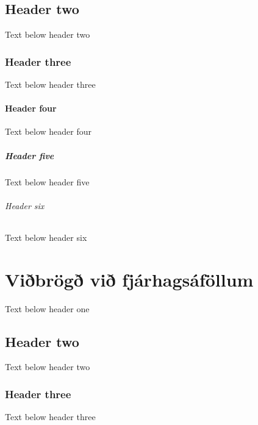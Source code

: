 \documentclass[a4paper,10pt,icelandic]{sphinxmanual}
\begin{document}
\section{Header two}
\label{\detokenize{eftirlaun-og-langtimassparnadur/index:header-two}}
\sphinxAtStartPar
Text below header two


\subsection{Header three}
\label{\detokenize{eftirlaun-og-langtimassparnadur/index:header-three}}
\sphinxAtStartPar
Text below header three


\subsubsection{Header four}
\label{\detokenize{eftirlaun-og-langtimassparnadur/index:header-four}}
\sphinxAtStartPar
Text below header four


\paragraph{Header five}
\label{\detokenize{eftirlaun-og-langtimassparnadur/index:header-five}}
\sphinxAtStartPar
Text below header five


\subparagraph{Header six}
\label{\detokenize{eftirlaun-og-langtimassparnadur/index:header-six}}
\sphinxAtStartPar
Text below header six

\sphinxstepscope


\chapter{Viðbrögð við fjárhagsáföllum}
\label{\detokenize{vidbrogd-vid-fjarhagsafollum/index:vibrog-vi-fjarhagsafollum}}\label{\detokenize{vidbrogd-vid-fjarhagsafollum/index::doc}}
\sphinxAtStartPar
Text below header one


\section{Header two}
\label{\detokenize{vidbrogd-vid-fjarhagsafollum/index:header-two}}
\sphinxAtStartPar
Text below header two


\subsection{Header three}
\label{\detokenize{vidbrogd-vid-fjarhagsafollum/index:header-three}}
\sphinxAtStartPar
Text below header three
\end{document}

